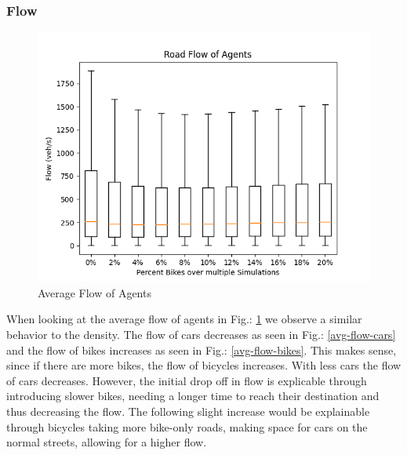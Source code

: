 \subsubsection{Flow}\label{flow}
\begin{figure}
  \centering
    \vspace{-1.15cm}
  \includegraphics[width=\linewidth]{./figures/road_flow_agent.png}
  \caption{Average Flow of Agents}\label{avg-flow-agents}
\end{figure}

When looking at the average flow of agents in Fig.: \ref{avg-flow-agents} we observe a similar behavior to the density. The flow of cars decreases as seen in Fig.: \ref{avg-flow-cars} and the flow of bikes increases as seen in Fig.: \ref{avg-flow-bikes}. This makes sense, since if there are more bikes, the flow of bicycles increases. With less cars the flow of cars decreases. However, the initial drop off in flow is explicable through introducing slower bikes, needing a longer time to reach their destination and thus decreasing the flow. The following slight increase would be explainable through bicycles taking more bike-only roads, making space for cars on the normal streets, allowing for a higher flow.


